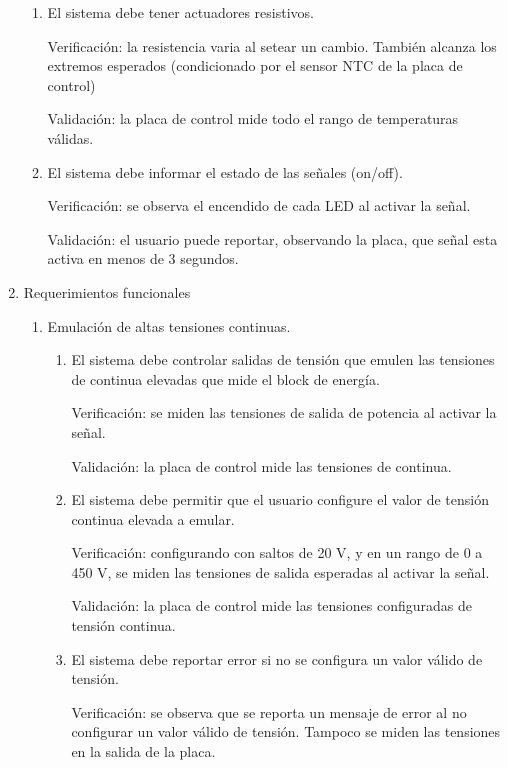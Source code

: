 \documentclass[
11pt, %
codirector, %
]{charter}
\begin{document}
\begin{enumerate}
\begin{enumerate}
		      \item El sistema debe tener actuadores resistivos.

		            Verificación: la resistencia varia al setear un cambio. También alcanza los extremos esperados
		            (condicionado por el sensor NTC de la placa de control)

		            Validación: la placa de control mide todo el rango de temperaturas válidas.

		      \item El sistema debe informar el estado de las señales (on/off).

		            Verificación: se observa el encendido de cada LED al activar la señal.

		            Validación: el usuario puede reportar, observando la placa, que señal esta activa en menos de 3 segundos.
	      \end{enumerate}
	\item Requerimientos funcionales
	      \begin{enumerate}
		      \item Emulación de altas tensiones continuas.
		            \begin{enumerate}
			            \item El sistema debe controlar salidas de tensión que emulen las tensiones de continua elevadas que mide el block de energía.

			                  Verificación: se miden las tensiones de salida de potencia al activar la señal.

			                  Validación: la placa de control mide las tensiones de continua.
			            \item El sistema debe permitir que el usuario configure el valor de tensión continua elevada a emular.

			                  Verificación: configurando con saltos de 20 V, y en un rango de 0 a 450 V, se miden las tensiones de salida esperadas al activar la señal.

			                  Validación: la placa de control mide las tensiones configuradas de tensión continua.

			            \item El sistema debe reportar error si no se configura un valor válido de tensión.

			                  Verificación: se observa que se reporta un mensaje de error al no configurar un valor válido de tensión. Tampoco se miden las tensiones en la salida de la placa.


\end{enumerate}
\end{enumerate}
\end{enumerate}
\end{document}
